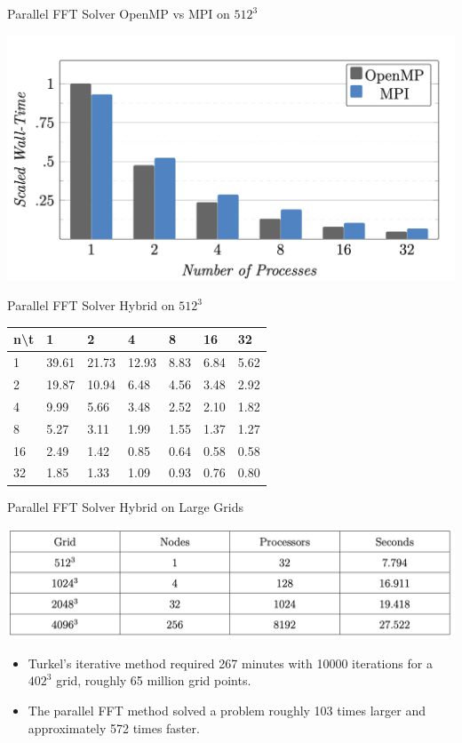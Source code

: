 \documentclass[handout]{beamer}
\begin{document}
\begin{frame}{Parallel FFT Solver OpenMP vs MPI on $512^3$}
\begin{center}
\includegraphics[scale=.35]{images/chart_var}
\end{center}
\end{frame}

\begin{frame}{Parallel FFT Solver Hybrid on $512^3$}
\begin{center}
\begin{tabularx}{\textwidth}{|X|X|X|X|X|X|X|}\hline
n\textbackslash t&1&2&4&8&16&32\\ \hline
1& 39.61&  21.73& 12.93& 8.83& 6.84& 5.62
\\ \hline
2& 19.87& 10.94& 6.48& 4.56& 3.48& 2.92
\\ \hline
4& 9.99& 5.66& 3.48& 2.52& 2.10& 1.82
\\ \hline
8& 5.27& 3.11& 1.99& 1.55& 1.37& 1.27
\\ \hline
16& 2.49& 1.42& 0.85& 0.64& 0.58& 0.58
\\ \hline
32& 1.85& 1.33& 1.09& 0.93& 0.76& 0.80
\\ \hline
\end{tabularx}
\end{center}
\end{frame}

\begin{frame}{Parallel FFT Solver Hybrid on Large Grids}
\begin{center}
\includegraphics[scale=.4]{images/hyb_Large}
\end{center}

\begin{itemize}
\item Turkel's iterative method required 267 minutes with 10000 iterations for a $402^3$ grid, roughly 65 million grid points.
\item The parallel FFT method solved a problem roughly 103 times larger and approximately 572 times faster.
\end{itemize}
\end{frame}
\end{document}
